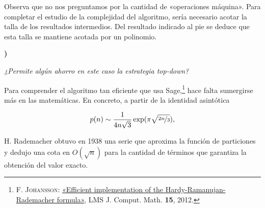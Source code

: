 \documentclass{article}
\newcounter{pregunta}
\newcommand\prop[1]%
{\addtocounter{pregunta}{1}
\noindent%
{\color{naranja_muy}\small\bf\thepregunta)}
\parbox[t]{.95\linewidth}{\it #1}}
\begin{document}
Observa que no nos preguntamos por la cantidad de
«operaciones máquina». Para completar el estudio de la
complejidad del algoritmo, sería necesario acotar la talla
de los resultados intermedios. Del resultado indicado al pie
se deduce que esta talla se mantiene acotada por un polinomio.

\prop%
{¿Permite algún ahorro en este caso la estrategia
  \emph{top-down}?}




\vfill

Para comprender el algoritmo tan eficiente que usa
Sage,\footnote{%
\textsc{F. Johansson}:
\href{http://dx.doi.org/10.1112/S1461157012001088}
{«Efficient implementation of the Hardy-Ramanujan-Rademacher
formula»},
LMS J. Comput. Math. {\bf 15}, 2012.}
hace falta sumergirse más en las matemáticas. En concreto, a
partir de la identidad asintótica

\begin{resalte}
[title=Hardy y Ramanujan (1918)]
\[p(n) \sim \frac 1 {4n\sqrt 3}
  \exp(\pi\sqrt{\nicefrac{2n}3}),\]
\end{resalte}

H. Rademacher obtuvo en 1938 una serie que aproxima la
función de particiones y dedujo una cota en $O(\sqrt n)$
para la cantidad de términos que garantiza la obtención del
valor exacto.

\end{document}
